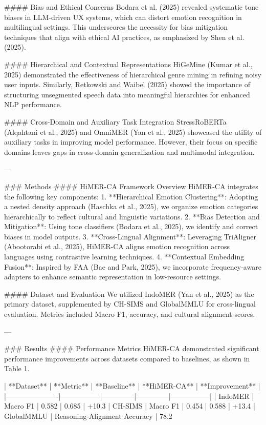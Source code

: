 #### Bias and Ethical Concerns  
Bodara et al. (2025) revealed systematic tone biases in LLM-driven UX systems, which can distort emotion recognition in multilingual settings. This underscores the necessity for bias mitigation techniques that align with ethical AI practices, as emphasized by Shen et al. (2025).

#### Hierarchical and Contextual Representations  
HiGeMine (Kumar et al., 2025) demonstrated the effectiveness of hierarchical genre mining in refining noisy user inputs. Similarly, Retkowski and Waibel (2025) showed the importance of structuring unsegmented speech data into meaningful hierarchies for enhanced NLP performance.

#### Cross-Domain and Auxiliary Task Integration  
StressRoBERTa (Alqahtani et al., 2025) and OmniMER (Yan et al., 2025) showcased the utility of auxiliary tasks in improving model performance. However, their focus on specific domains leaves gaps in cross-domain generalization and multimodal integration.

---

### Methods  
#### HiMER-CA Framework Overview  
HiMER-CA integrates the following key components:  
1. **Hierarchical Emotion Clustering**: Adopting a nested density approach (Haschka et al., 2025), we organize emotion categories hierarchically to reflect cultural and linguistic variations.  
2. **Bias Detection and Mitigation**: Using tone classifiers (Bodara et al., 2025), we identify and correct biases in model outputs.  
3. **Cross-Lingual Alignment**: Leveraging TriAligner (Abootorabi et al., 2025), HiMER-CA aligns emotion recognition across languages using contrastive learning techniques.  
4. **Contextual Embedding Fusion**: Inspired by FAA (Bae and Park, 2025), we incorporate frequency-aware adapters to enhance semantic representation in low-resource settings.

#### Dataset and Evaluation  
We utilized IndoMER (Yan et al., 2025) as the primary dataset, supplemented by CH-SIMS and GlobalMMLU for cross-lingual evaluation. Metrics included Macro F1, accuracy, and cultural alignment scores.

---

### Results  
#### Performance Metrics  
HiMER-CA demonstrated significant performance improvements across datasets compared to baselines, as shown in Table 1.

| **Dataset**         | **Metric**      | **Baseline** | **HiMER-CA** | **Improvement** |
|----------------------|-----------------|--------------|--------------|-----------------|
| IndoMER             | Macro F1        | 0.582        | 0.685        | +10.3%
| CH-SIMS             | Macro F1        | 0.454        | 0.588        | +13.4%
| GlobalMMLU          | Reasoning-Alignment Accuracy | 78.2%

